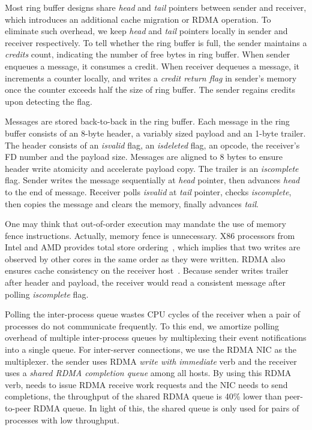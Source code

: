 Most ring buffer designs share \textit{head} and \textit{tail} pointers between sender and receiver, which introduces an additional cache migration or RDMA operation. To eliminate such overhead, we keep \textit{head} and \textit{tail} pointers locally in sender and receiver respectively.
To tell whether the ring buffer is full, the sender maintains a \textit{credits} count, indicating the number of free bytes in ring buffer. When sender enqueues a message, it consumes a credit. When receiver dequeues a message, it increments a counter locally, and writes a \textit{credit return flag} in sender's memory once the counter exceeds half the size of ring buffer. The sender regains credits upon detecting the flag.

Messages are stored back-to-back in the ring buffer. Each message in the ring buffer consists of an 8-byte header, a variably sized payload and an 1-byte trailer. The header consists of an \textit{isvalid} flag, an \textit{isdeleted} flag, an opcode, the receiver's FD number and the payload size. Messages are aligned to 8 bytes to ensure header write atomicity and accelerate payload copy. The trailer is an \textit{iscomplete} flag. Sender writes the message sequentially at \textit{head} pointer, then advances \textit{head} to the end of message. Receiver polls \textit{isvalid} at \textit{tail} pointer, checks \textit{iscomplete}, then copies the message and clears the memory, finally advances \textit{tail}.

One may think that out-of-order execution may mandate the use of memory fence instructions. Actually, memory fence is unnecessary. X86 processors from Intel and AMD provides total store ordering~\cite{sewell2010x86,intel-manual}, which implies that two writes are observed by other cores in the same order as they were written. RDMA also ensures cache consistency on the receiver host~\cite{infiniband2000infiniband}. Because sender writes trailer after header and payload, the receiver would read a consistent message after polling \textit{iscomplete} flag.

Polling the inter-process queue wastes CPU cycles of the receiver when a pair of processes do not communicate frequently. To this end, we amortize polling overhead of multiple inter-process queues by multiplexing their event notifications into a single queue.
For inter-server connections, we use the RDMA NIC as the multiplexer. the sender uses RDMA \textit{write with immediate} verb and the receiver uses a \textit{shared RDMA completion queue} among all hosts. By using this RDMA verb, \libipc{} needs to issue RDMA receive work requests and the NIC needs to send completions, the throughput of the shared RDMA queue is 40\% lower than peer-to-peer RDMA queue. In light of this, the shared queue is only used for pairs of processes with low throughput.

